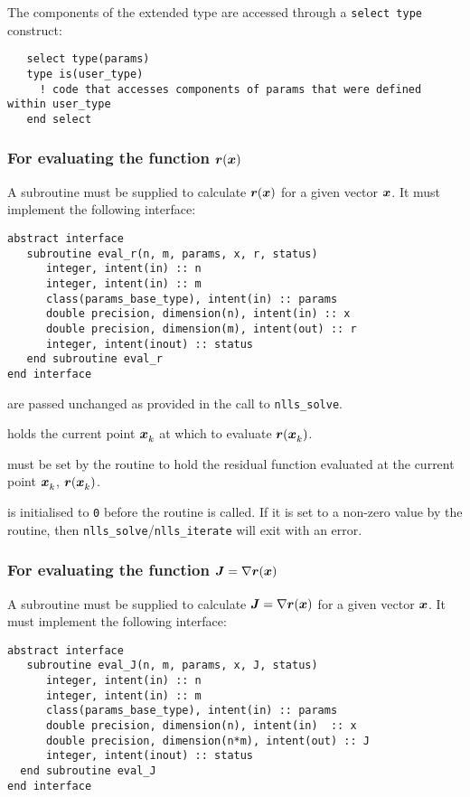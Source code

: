 \documentclass{spec}
\begin{document}
The components of the extended type are accessed through a \texttt{select type}
construct:
\begin{verbatim}
   select type(params)
   type is(user_type)
     ! code that accesses components of params that were defined within user_type
   end select
\end{verbatim}

\subsubsection{For evaluating the function ${\bm r}({\bm x})$}
A subroutine must be supplied to calculate ${\bm r}({\bm x})$ for a given vector ${\bm x}$. It
must implement the following interface:

\begin{verbatim}
abstract interface
   subroutine eval_r(n, m, params, x, r, status)
      integer, intent(in) :: n
      integer, intent(in) :: m
      class(params_base_type), intent(in) :: params
      double precision, dimension(n), intent(in) :: x
      double precision, dimension(m), intent(out) :: r
      integer, intent(inout) :: status
   end subroutine eval_r
end interface
\end{verbatim}

\begin{description}
    are passed unchanged as provided in the call to
      {\tt nlls\_solve}.

    holds the current point ${\bm x}_{k}^{}$ at which to evaluate ${\bm r}({\bm x}_{k}^{})$.

    must be set by the routine to hold the residual function
      evaluated at the current point ${\bm x}_{k}^{}$, ${\bm r}({\bm x}_{k}^{})$.

    is initialised to \texttt{0} before the routine is
      called. If it is set to a non-zero value by the routine, then 
      {\tt nlls\_solve}/{\tt nlls\_iterate} will exit with an error.
\end{description}

\subsubsection{For evaluating the function ${\bm J} = \nabla {\bm r}({\bm x})$}
A subroutine must be supplied to calculate ${\bm J} = \nabla {\bm r}({\bm x})$ for a given vector ${\bm x}$. It
must implement the following interface:

\begin{verbatim}
abstract interface
   subroutine eval_J(n, m, params, x, J, status)
      integer, intent(in) :: n
      integer, intent(in) :: m
      class(params_base_type), intent(in) :: params
      double precision, dimension(n), intent(in)  :: x
      double precision, dimension(n*m), intent(out) :: J
      integer, intent(inout) :: status
  end subroutine eval_J
end interface
\end{verbatim}
\end{document}
